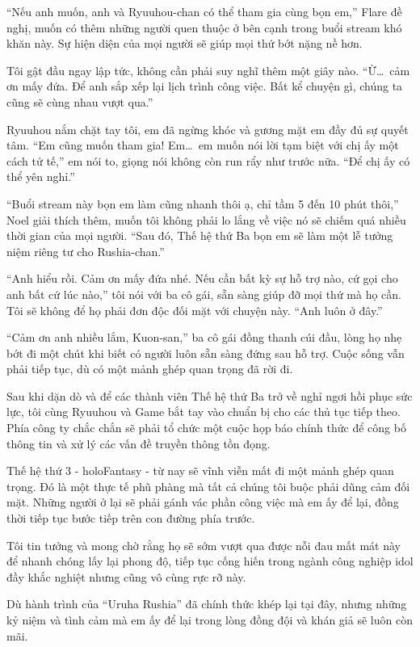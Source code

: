 \documentclass[../main.tex]{subfiles}
\begin{document}
``Nếu anh muốn, anh và Ryuuhou-chan có thể tham gia cùng bọn em,'' Flare đề nghị, muốn có thêm những người quen thuộc ở bên cạnh trong buổi stream khó khăn này. Sự hiện diện của mọi người sẽ giúp mọi thứ bớt nặng nề hơn.

Tôi gật đầu ngay lập tức, không cần phải suy nghĩ thêm một giây nào. ``Ừ\dots\ cảm ơn mấy đứa. Để anh sắp xếp lại lịch trình công việc. Bất kể chuyện gì, chúng ta cũng sẽ cùng nhau vượt qua.''

Ryuuhou nắm chặt tay tôi, em đã ngừng khóc và gương mặt em đầy đủ sự quyết tâm. ``Em cũng muốn tham gia! Em\dots\ em muốn nói lời tạm biệt với chị ấy một cách tử tế,'' em nói to, giọng nói không còn run rẩy như trước nữa. ``Để chị ấy có thể yên nghỉ.''

``Buổi stream này bọn em làm cũng nhanh thôi ạ, chỉ tầm 5 đến 10 phút thôi,'' Noel giải thích thêm, muốn tôi không phải lo lắng về việc nó sẽ chiếm quá nhiều thời gian của mọi người. ``Sau đó, Thế hệ thứ Ba bọn em sẽ làm một lễ tưởng niệm riêng tư cho Rushia-chan.''

``Anh hiểu rồi. Cảm ơn mấy đứa nhé. Nếu cần bất kỳ sự hỗ trợ nào, cứ gọi cho anh bất cứ lúc nào,'' tôi nói với ba cô gái, sẵn sàng giúp đỡ mọi thứ mà họ cần. Tôi sẽ không để họ phải đơn độc đối mặt với chuyện này. ``Anh luôn ở đây.''

``Cảm ơn anh nhiều lắm, Kuon-san,'' ba cô gái đồng thanh cúi đầu, lòng họ nhẹ bớt đi một chút khi biết có người luôn sẵn sàng đứng sau hỗ trợ. Cuộc sống vẫn phải tiếp tục, dù có một mảnh ghép quan trọng đã rời đi.

\ct

Sau khi dặn dò và để các thành viên Thế hệ thứ Ba trở về nghỉ ngơi hồi phục sức lực, tôi cùng Ryuuhou và Game bắt tay vào chuẩn bị cho các thủ tục tiếp theo. Phía công ty chắc chắn sẽ phải tổ chức một cuộc họp báo chính thức để công bố thông tin và xử lý các vấn đề truyền thông tồn đọng.

Thế hệ thứ 3 - holoFantasy - từ nay sẽ vĩnh viễn mất đi một mảnh ghép quan trọng. Đó là một thực tế phũ phàng mà tất cả chúng tôi buộc phải dũng cảm đối mặt. Những người ở lại sẽ phải gánh vác phần công việc mà em ấy để lại, đồng thời tiếp tục bước tiếp trên con đường phía trước.

Tôi tin tưởng và mong chờ rằng họ sẽ sớm vượt qua được nỗi đau mất mát này để nhanh chóng lấy lại phong độ, tiếp tục cống hiến trong ngành công nghiệp idol đầy khắc nghiệt nhưng cũng vô cùng rực rỡ này.

Dù hành trình của ``Uruha Rushia'' đã chính thức khép lại tại đây, nhưng những kỷ niệm và tình cảm mà em ấy để lại trong lòng đồng đội và khán giả sẽ luôn còn mãi.
\end{document}
